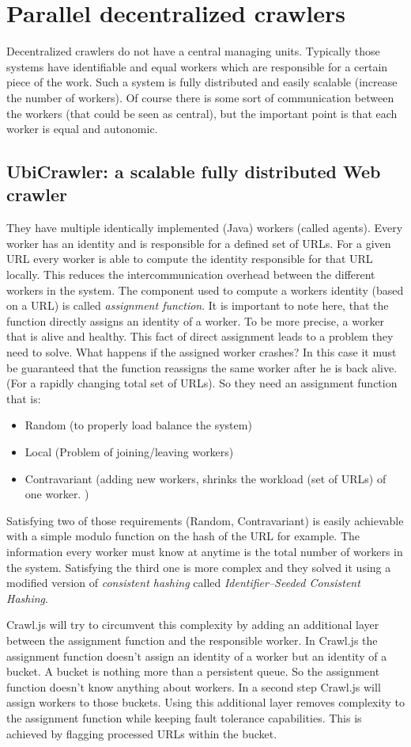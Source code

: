 \section{Parallel decentralized crawlers}
Decentralized crawlers do not have a central managing units. Typically those systems have identifiable and equal workers which are responsible for a certain piece of the work. Such a system is fully distributed and easily scalable (increase the number of workers). Of course there is some sort of communication between the workers (that could be seen as central), but the important point is that each worker is equal and autonomic.

\subsection{UbiCrawler: a scalable fully distributed Web crawler \cite{ubicrawler}}
They have multiple identically implemented (Java) workers (called agents). Every worker has an identity and is responsible for a defined set of URLs. For a given URL every worker is able to compute the identity responsible for that URL locally. This reduces the intercommunication overhead between the different workers in the system. The component used to compute a workers identity (based on a URL) is called \emph{assignment function}. It is important to note here, that the function directly assigns an identity of a worker. To be more precise, a worker that is alive and healthy. This fact of direct assignment leads to a problem they need to solve. What happens if the assigned worker crashes? In this case it must be guaranteed that the function reassigns the same worker after he is back alive. (For a rapidly changing total set of URLs). So they need an assignment function that is:
\begin{itemize}
\item Random (to properly load balance the system)
\item Local (Problem of joining/leaving workers)
\item Contravariant (adding new workers, shrinks the workload (set of URLs) of one worker. )
\end{itemize}
Satisfying two of those requirements (Random, Contravariant) is easily achievable with a simple modulo function on the hash of the URL for example. The information every worker must know at anytime is the total number of workers in the system. Satisfying the third one is more complex and they solved it using a modified version of \emph{consistent hashing} called \emph{Identifier–Seeded Consistent Hashing}. 

Crawl.js will try to circumvent this complexity by adding an additional layer between the assignment function and the responsible worker. In Crawl.js the assignment function doesn't assign an identity of a worker but an identity of a bucket. A bucket is nothing more than a persistent queue. So the assignment function doesn't know anything about workers. In a second step Crawl.js will assign workers to those buckets. Using this additional layer removes complexity to the assignment function while keeping fault tolerance capabilities. This is achieved by flagging processed URLs within the bucket.
